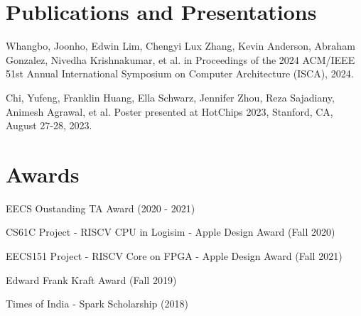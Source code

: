 \documentclass[]{deedy-resume-openfont}
\begin{document}
\section{Publications and Presentations}
\vspace{8pt}
\begin{tightemize}
\item Whangbo, Joonho, Edwin Lim, Chengyi Lux Zhang, Kevin Anderson, Abraham Gonzalez, Nivedha Krishnakumar, et al.  in Proceedings of the 2024 ACM/IEEE 51st Annual International Symposium on Computer Architecture (ISCA), 2024.
\item Chi, Yufeng, Franklin Huang, Ella Schwarz, Jennifer Zhou, Reza Sajadiany, Animesh Agrawal, et al. \href{https://hc2023.hotchips.org/assets/program/posters/HC2023.UCBerkeley.YufengChi.Poster.v06.pdf} {} Poster presented at HotChips 2023, Stanford, CA, August 27-28, 2023.
\end{tightemize}
\sectionsep

\section{Awards}
\vspace{8pt}
\begin{tightemize}
\item EECS Oustanding TA Award (2020 - 2021)
\item CS61C Project - RISCV CPU in Logisim - Apple Design Award (Fall 2020)
\item EECS151 Project - RISCV Core on FPGA - Apple Design Award (Fall 2021)
\item Edward Frank Kraft Award (Fall 2019)
\item Times of India - Spark Scholarship (2018)
\end{tightemize}
\sectionsep
\end{document}
